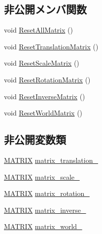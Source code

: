 \subsection*{非公開メンバ関数}
\begin{DoxyCompactItemize}
\item 
void \mbox{\hyperlink{class_matrix_extend_a81db064716c74390d9c4b7e1022a4b27}{Reset\+All\+Matrix}} ()
\item 
void \mbox{\hyperlink{class_matrix_extend_aea89536d6cbcc73909ee79111f13dd28}{Reset\+Translation\+Matrix}} ()
\item 
void \mbox{\hyperlink{class_matrix_extend_a1932807f81cebd1d4d101ad4be13e55d}{Reset\+Scale\+Matrix}} ()
\item 
void \mbox{\hyperlink{class_matrix_extend_a52ebf23df3851d1225faf7211595811f}{Reset\+Rotation\+Matrix}} ()
\item 
void \mbox{\hyperlink{class_matrix_extend_a14f5cf7ced273e96c238cc416d0719ac}{Reset\+Inverse\+Matrix}} ()
\item 
void \mbox{\hyperlink{class_matrix_extend_a06d4bd42be11fba786917bef61a4e66d}{Reset\+World\+Matrix}} ()
\end{DoxyCompactItemize}
\subsection*{非公開変数類}
\begin{DoxyCompactItemize}
\item 
\mbox{\hyperlink{_vector3_d_8h_a032295cd9fb1b711757c90667278e744}{M\+A\+T\+R\+IX}} \mbox{\hyperlink{class_matrix_extend_a265c3939a53787d87ee9c27386ebff7f}{matrix\+\_\+translation\+\_\+}}
\item 
\mbox{\hyperlink{_vector3_d_8h_a032295cd9fb1b711757c90667278e744}{M\+A\+T\+R\+IX}} \mbox{\hyperlink{class_matrix_extend_ad52c6304eb4d66c787b386b60b8f3492}{matrix\+\_\+scale\+\_\+}}
\item 
\mbox{\hyperlink{_vector3_d_8h_a032295cd9fb1b711757c90667278e744}{M\+A\+T\+R\+IX}} \mbox{\hyperlink{class_matrix_extend_a13ea114cb34c9bafd161218a5dc9a910}{matrix\+\_\+rotation\+\_\+}}
\item 
\mbox{\hyperlink{_vector3_d_8h_a032295cd9fb1b711757c90667278e744}{M\+A\+T\+R\+IX}} \mbox{\hyperlink{class_matrix_extend_a5b0c6e48cb1c541aabe7173378b7bc36}{matrix\+\_\+inverse\+\_\+}}
\item 
\mbox{\hyperlink{_vector3_d_8h_a032295cd9fb1b711757c90667278e744}{M\+A\+T\+R\+IX}} \mbox{\hyperlink{class_matrix_extend_ae464d60827194857bc39c2f0cffd768b}{matrix\+\_\+world\+\_\+}}
\end{DoxyCompactItemize}


